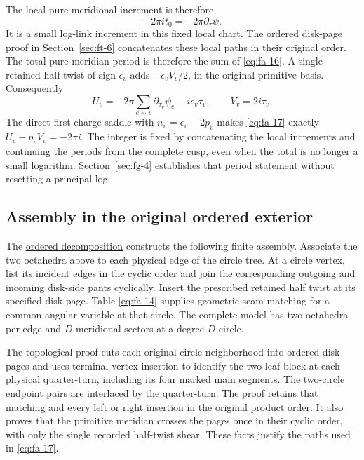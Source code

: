 The local pure meridional increment is therefore
\begin{equation}
-2\pi it_0=-2\pi\partial_\tau\psi.
\label{eq:fa-16}
\end{equation}
It is a small log-link increment in this fixed local chart. The ordered disk-page proof in Section~\ref{sec:ft-6} concatenates these local paths in their original order. The total pure meridian period is therefore the sum of \eqref{eq:fa-16}. A single retained half twist of sign \(\epsilon_v\) adds \(-\epsilon_vV_v/2\), in the original primitive basis. Consequently
\begin{equation}
U_v=-2\pi\sum_{e\sim v}\partial_{\tau_v}\psi_e
                         -i\epsilon_v\tau_v,
 \qquad V_v=2i\tau_v.
\label{eq:fa-17}
\end{equation}
The direct first-charge saddle with \(n_v=\epsilon_v-2p_v\) makes \eqref{eq:fa-17} exactly \(U_v+p_vV_v=-2\pi i\). The integer is fixed by concatenating the local increments and continuing the periods from the complete cusp, even when the total is no longer a small logarithm. Section~\ref{sec:fg-4} establishes that period statement without resetting a principal log.

\subsection{Assembly in the original ordered exterior}\label{sec:fa-6}

The \hyperref[sec:ft]{ordered decomposition} constructs the following finite assembly. Associate the two octahedra above to each physical edge of the circle tree. At a circle vertex, list its incident edges in the cyclic order and join the corresponding outgoing and incoming disk-side pants cyclically. Insert the prescribed retained half twist at its specified disk page. Table \eqref{eq:fa-14} supplies geometric seam matching for a common angular variable at that circle. The complete model has two octahedra per edge and \(D\) meridional sectors at a degree-\(D\) circle.

The topological proof cuts each original circle neighborhood into ordered disk pages and uses terminal-vertex insertion to identify the two-leaf block at each physical quarter-turn, including its four marked main segments. The two-circle endpoint pairs are interlaced by the quarter-turn. The proof retains that matching and every left or right insertion in the original product order. It also proves that the primitive meridian crosses the pages once in their cyclic order, with only the single recorded half-twist shear. These facts justify the paths used in \eqref{eq:fa-17}.

